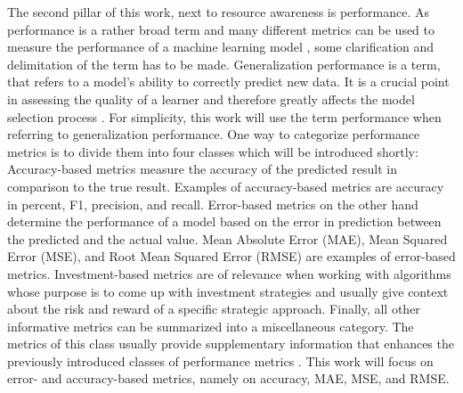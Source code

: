 The second pillar of this work, next to resource awareness is performance. As performance is a rather broad term and many different metrics can be used to measure the performance of a machine learning model \cite{erickson2021}, some clarification and delimitation of the term has to be made. Generalization performance is a term, that refers to a model's ability to correctly predict new data. It is a crucial point in assessing the quality of a learner and therefore greatly affects the model selection process \cite{hastie2009}. For simplicity, this work will use the term performance when referring to generalization performance. One way to categorize performance metrics is to divide them into four classes which will be introduced shortly: Accuracy-based metrics measure the accuracy of the predicted result in comparison to the true result. Examples of accuracy-based metrics are accuracy in percent, F1, precision, and recall. Error-based metrics on the other hand determine the performance of a model based on the error in prediction between the predicted and the actual value. Mean Absolute Error (MAE), Mean Squared Error (MSE), and Root Mean Squared Error (RMSE) are examples of error-based metrics. Investment-based metrics are of relevance when working with algorithms whose purpose is to come up with investment strategies and usually give context about the risk and reward of a specific strategic approach. Finally, all other informative metrics can be summarized into a miscellaneous category. The metrics of this class usually provide supplementary information that enhances the previously introduced classes of performance metrics \cite{dessain2022}. This work will focus on error- and accuracy-based metrics, namely on accuracy, MAE, MSE, and RMSE.

